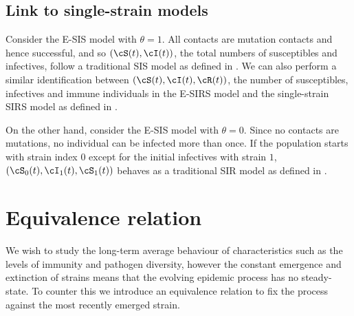 \documentclass[smallextended]{svjour3}       %
\begin{document}
\subsection{Link to single-strain models}\label{subsec: no evo}
Consider the E-SIS model with $\theta = 1$. All contacts are mutation contacts and hence successful, and so $(\cS(t),\cI(t))$, the total numbers of susceptibles and infectives, follow a traditional SIS model as defined in \cite{Andersson2000}. We can also perform a similar identification between $(\cS(t),\cI(t),\cR(t))$, the number of susceptibles, infectives and immune individuals in the E-SIRS model and the single-strain SIRS model as defined in \cite{nasell2002}.

On the other hand, consider the E-SIS model with $\theta = 0$. Since no contacts are mutations, no individual can be infected more than once. If the population starts with strain index $0$ except for the initial infectives with strain $1$, $(\cS_{0}(t), \cI_{1}(t), \cS_{1}(t))$ behaves as a traditional SIR model as defined in \cite{Andersson2000}. 
% 
% 

\section{Equivalence relation}\label{sec: equiv}
We wish to study the long-term average behaviour of characteristics such as the levels of immunity and pathogen diversity, however the constant emergence and extinction of strains means that the evolving epidemic process has no steady-state. To counter this we introduce an equivalence relation to fix the process against the most recently emerged strain. 
\end{document}
